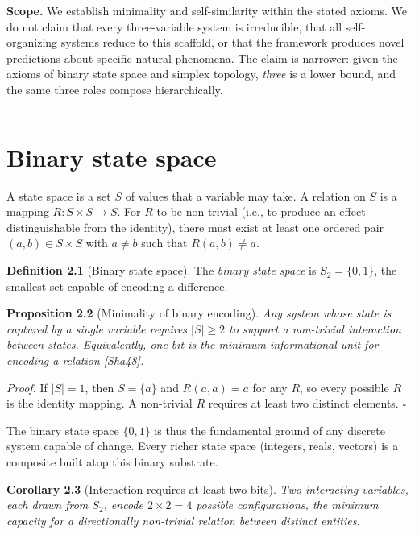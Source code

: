 \documentclass[12pt]{article}
\begin{document}
\textbf{Scope.} We establish minimality and self-similarity within the
stated axioms. We do not claim that every three-variable system is
irreducible, that all self-organizing systems reduce to this scaffold,
or that the framework produces novel predictions about specific natural
phenomena. The claim is narrower: given the axioms of binary state space
and simplex topology, \emph{three} is a lower bound, and the same three
roles compose hierarchically.

\begin{center}\rule{0.5\linewidth}{0.5pt}\end{center}

\section{Binary state space}\label{binary-state-space}

A state space is a set \(S\) of values that a variable may take. A
relation on \(S\) is a mapping \(R: S \times S \to S\). For \(R\) to be
non-trivial (i.e., to produce an effect distinguishable from the
identity), there must exist at least one ordered pair
\((a, b) \in S \times S\) with \(a \neq b\) such that
\(R(a, b) \neq a\).

\textbf{Definition 2.1} (Binary state space). The \emph{binary state
space} is \(S_2 = \{0, 1\}\), the smallest set capable of encoding a
difference.

\textbf{Proposition 2.2} (Minimality of binary encoding). \emph{Any
system whose state is captured by a single variable requires
\(|S| \ge 2\) to support a non-trivial interaction between states.
Equivalently, one bit is the minimum informational unit for encoding a
relation {[}Sha48{]}.}

\emph{Proof.} If \(|S| = 1\), then \(S = \{a\}\) and \(R(a, a) = a\) for
any \(R\), so every possible \(R\) is the identity mapping. A
non-trivial \(R\) requires at least two distinct elements. \(\square\)

The binary state space \(\{0, 1\}\) is thus the fundamental ground of
any discrete system capable of change. Every richer state space
(integers, reals, vectors) is a composite built atop this binary
substrate.

\textbf{Corollary 2.3} (Interaction requires at least two bits).
\emph{Two interacting variables, each drawn from \(S_2\), encode
\(2 \times 2 = 4\) possible configurations, the minimum capacity for a
directionally non-trivial relation between distinct entities.}
\end{document}
